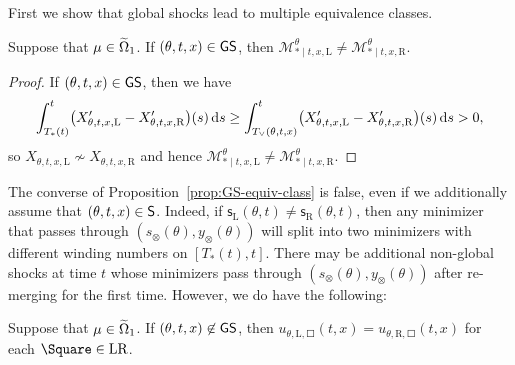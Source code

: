 \documentclass[AHL,Unicode,longabstracts]{cedram}
\newcommand*\ssS{\mathsf{S}}
\newcommand*\GS{\mathsf{GS}}
\newcommand*\sfs{\mathsf{s}}
\newcommand*\scM{\mathscr{M}}
\newcommand*\dif{\mathrm{d}}
\newcommand*\Left{\mathrm{L}}
\newcommand*\Right{\mathrm{R}}
\newcommand*\LR{\mathrm{LR}}
\let\oldin\in
\renewcommand{\in}{\mathchoice{\oldin}{\oldin}{\,\oldin\,}{\,\oldin\,}}
\let\originalleft\left
\let\originalright\right
\renewcommand{\left}{\mathopen{}\mathclose\bgroup\originalleft}
\renewcommand{\right}{\aftergroup\egroup\originalright}
\begin{document}
First we show that global shocks lead to multiple equivalence classes.

\begin{prop}\label{prop:GS-equiv-class}
Suppose that $\mu\in\widetilde{\Omega}_{1}$. If $(\theta,t,x)\in\GS$, then $\scM_{*\mid t,x,\Left}^{\theta}\ne\scM_{*\mid t,x,\Right}^{\theta}$.
\end{prop}

\begin{proof}
If $(\theta,t,x)\in\GS$, then we have
\[
\int_{T_{*}(t)}^{t}\left(X_{\theta,t,x,\Left}'-X_{\theta,t,x,\Right}'\right)(s)\,\dif s\ge\int_{T_{\vee}(\theta,t,x)}^{t}\left(X_{\theta,t,x,\Left}'-X_{\theta,t,x,\Right}'\right)(s)\,\dif s>0,
\]
so $X_{\theta,t,x,\Left}\not\sim X_{\theta,t,x,\Right}$ and hence $\scM_{*\mid t,x,\Left}^{\theta}\ne\scM_{*\mid t,x,\Right}^{\theta}$.
\end{proof}

The converse of Proposition~\ref{prop:GS-equiv-class} is false, even if we additionally assume that $(\theta,t,x)\in\ssS$. Indeed, if $\sfs_{\Left}(\theta,t)\ne\sfs_{\Right}(\theta,t)$, then any minimizer that passes through $(s_{\otimes}(\theta),y_{\otimes}(\theta))$ will split into two minimizers with different winding numbers on $[T_{*}(t),t]$. There may be additional non-global shocks at time $t$ whose minimizers pass through $(s_{\otimes}(\theta),y_{\otimes}(\theta))$ after re-merging for the first time. However, we do have the following:

\begin{prop}\label{prop:globalshocknojump}
Suppose that $\mu\in\widetilde{\Omega}_{1}$. If $(\theta,t,x)\not\in\GS$, then $u_{\theta,\Left,\Square}(t,x)=u_{\theta,\Right,\Square}(t,x)$ for each $\Square\in\LR$.
\end{prop}
\end{document}
